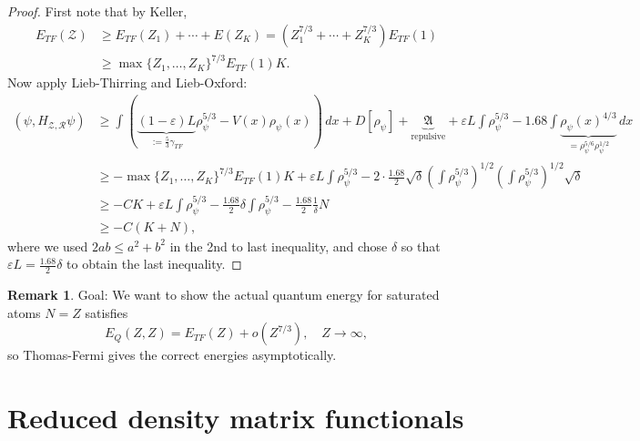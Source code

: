 \documentclass[11pt]{amsart}
\theoremstyle{definition}
\theoremstyle{definition}
\theoremstyle{definition}
\newtheorem*{rmk}{Remark}
\numberwithin{equation}{section}
\begin{document}
\begin{proof}
First note that by Keller,
\begin{align*}
E_{TF}(\mathcal{Z})&\ge E_{TF}(Z_1)+\cdots+E(Z_K)=(Z_1^{7/3}+\cdots+Z_K^{7/3})E_{TF}(1)\\
&\ge\max\{Z_1,\ldots,Z_K\}^{7/3}E_{TF}(1)K.
\end{align*}
Now apply Lieb-Thirring and Lieb-Oxford:
\begin{align*}
(\psi,H_{\mathcal{Z},\mathcal{R}}\psi)&\ge \int(\underbrace{(1-\varepsilon)L}_{:=\frac{5}{3}\gamma_{TF}}\rho_\psi^{5/3}-V(x)\rho_\psi(x))\,dx+D[\rho_\psi]+\underbrace{\mathfrak{A}}_{\text{repulsive}}+\varepsilon L\int \rho_\psi^{5/3}-1.68\int\underbrace{\rho_\psi(x)^{4/3}}_{=\rho_\psi^{5/6}\rho_\psi^{1/2}}\,dx\\
&\ge -\max\{Z_1,\ldots,Z_K\}^{7/3}E_{TF}(1)K+\varepsilon L\int \rho_\psi^{5/3}-2\cdot\frac{1.68}{2}\sqrt{\delta}\left(\int \rho_\psi^{5/3}\right)^{1/2}\left(\int\rho_\psi^{5/3}\right)^{1/2}\sqrt{\delta}\\
&\ge -CK+\varepsilon L\int\rho_\psi^{5/3}-\frac{1.68}{2}\delta \int\rho_\psi^{5/3}-\frac{1.68}{2}\frac{1}{\delta}N\\
&\ge -C(K+N),
\end{align*}
where we used $2ab\le a^2+b^2$ in the 2nd to last inequality, and chose $\delta$ so that $\varepsilon L=\frac{1.68}{2}\delta$ to obtain the last inequality.
\end{proof}


\begin{rmk}
Goal: We want to show the actual quantum energy for saturated atoms $N=Z$ satisfies
\begin{equation}
E_Q(Z,Z)=E_{TF}(Z)+o(Z^{7/3}),\quad Z\to\infty,
\end{equation}
so Thomas-Fermi gives the correct energies asymptotically.
\end{rmk}

\section{Reduced density matrix functionals}
\end{document}
